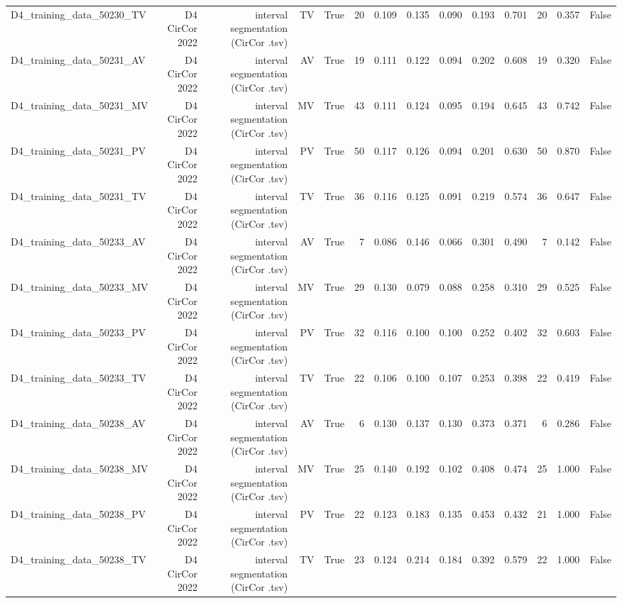 \begin{table}[htbp]
\begin{tabular}{lrrrrrrrrrrrrr}
    D4\_training\_data\_50230\_TV & D4 CirCor 2022 & interval segmentation (CirCor .tsv) & TV & True & 20 & 0.109 & 0.135 & 0.090 & 0.193 & 0.701 & 20 & 0.357 & False \\
    D4\_training\_data\_50231\_AV & D4 CirCor 2022 & interval segmentation (CirCor .tsv) & AV & True & 19 & 0.111 & 0.122 & 0.094 & 0.202 & 0.608 & 19 & 0.320 & False \\
    D4\_training\_data\_50231\_MV & D4 CirCor 2022 & interval segmentation (CirCor .tsv) & MV & True & 43 & 0.111 & 0.124 & 0.095 & 0.194 & 0.645 & 43 & 0.742 & False \\
    D4\_training\_data\_50231\_PV & D4 CirCor 2022 & interval segmentation (CirCor .tsv) & PV & True & 50 & 0.117 & 0.126 & 0.094 & 0.201 & 0.630 & 50 & 0.870 & False \\
    D4\_training\_data\_50231\_TV & D4 CirCor 2022 & interval segmentation (CirCor .tsv) & TV & True & 36 & 0.116 & 0.125 & 0.091 & 0.219 & 0.574 & 36 & 0.647 & False \\
    D4\_training\_data\_50233\_AV & D4 CirCor 2022 & interval segmentation (CirCor .tsv) & AV & True & 7 & 0.086 & 0.146 & 0.066 & 0.301 & 0.490 & 7 & 0.142 & False \\
    D4\_training\_data\_50233\_MV & D4 CirCor 2022 & interval segmentation (CirCor .tsv) & MV & True & 29 & 0.130 & 0.079 & 0.088 & 0.258 & 0.310 & 29 & 0.525 & False \\
    D4\_training\_data\_50233\_PV & D4 CirCor 2022 & interval segmentation (CirCor .tsv) & PV & True & 32 & 0.116 & 0.100 & 0.100 & 0.252 & 0.402 & 32 & 0.603 & False \\
    D4\_training\_data\_50233\_TV & D4 CirCor 2022 & interval segmentation (CirCor .tsv) & TV & True & 22 & 0.106 & 0.100 & 0.107 & 0.253 & 0.398 & 22 & 0.419 & False \\
    D4\_training\_data\_50238\_AV & D4 CirCor 2022 & interval segmentation (CirCor .tsv) & AV & True & 6 & 0.130 & 0.137 & 0.130 & 0.373 & 0.371 & 6 & 0.286 & False \\
    D4\_training\_data\_50238\_MV & D4 CirCor 2022 & interval segmentation (CirCor .tsv) & MV & True & 25 & 0.140 & 0.192 & 0.102 & 0.408 & 0.474 & 25 & 1.000 & False \\
    D4\_training\_data\_50238\_PV & D4 CirCor 2022 & interval segmentation (CirCor .tsv) & PV & True & 22 & 0.123 & 0.183 & 0.135 & 0.453 & 0.432 & 21 & 1.000 & False \\
    D4\_training\_data\_50238\_TV & D4 CirCor 2022 & interval segmentation (CirCor .tsv) & TV & True & 23 & 0.124 & 0.214 & 0.184 & 0.392 & 0.579 & 22 & 1.000 & False \\

\end{tabular}
\end{table}
